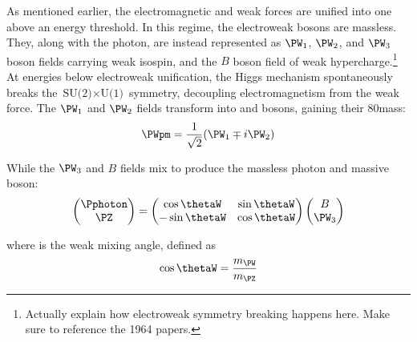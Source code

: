 
As mentioned earlier, the electromagnetic and weak forces are unified into one above an energy threshold. In this regime, the electroweak bosons are massless. They, along with the photon, are instead represented as $\PW_1$, $\PW_2$, and $\PW_3$ boson fields carrying weak isospin, and the $B$ boson field of weak hypercharge.\footnote{Actually explain how electroweak symmetry breaking happens here. Make sure to reference the 1964 papers.} At energies below electroweak unification, the Higgs mechanism spontaneously breaks the $\text{SU(2)} \times \text{U(1)}$ symmetry, decoupling electromagnetism from the weak force. The $\PW_1$ and $\PW_2$ fields transform into \PWplus and \PWminus bosons, gaining their 80\GeV mass:
\begin{equation}
    \PWpm = \frac{1}{\sqrt{2}} (\PW_1 \mp i\PW_2)
    \label{eq:EWSB_W}
\end{equation}

While the $\PW_3$ and $B$ fields mix to produce the massless photon and massive \PZ boson:
\begin{equation}
    \begin{pmatrix} \Pphoton \\ \PZ \end{pmatrix} = \begin{pmatrix} \cos\thetaW & \sin\thetaW \\ -\sin\thetaW & \cos\thetaW \end{pmatrix} \begin{pmatrix} B \\ \PW_3 \end{pmatrix}
    \label{eq:EWSB_photon_Z}
\end{equation}

where \thetaW is the weak mixing angle, defined as
\begin{equation}
    \cos\thetaW = \frac{m_{\PW}}{m_{\PZ}}
    \label{eq:weak_mixing_angle}
\end{equation}

